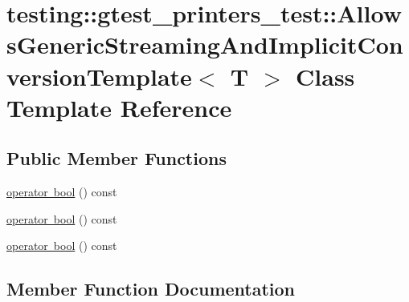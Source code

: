\hypertarget{classtesting_1_1gtest__printers__test_1_1_allows_generic_streaming_and_implicit_conversion_template}{}\section{testing\+::gtest\+\_\+printers\+\_\+test\+::Allows\+Generic\+Streaming\+And\+Implicit\+Conversion\+Template$<$ T $>$ Class Template Reference}
\label{classtesting_1_1gtest__printers__test_1_1_allows_generic_streaming_and_implicit_conversion_template}
\subsection*{Public Member Functions}
\begin{DoxyCompactItemize}
\item 
\mbox{\hyperlink{classtesting_1_1gtest__printers__test_1_1_allows_generic_streaming_and_implicit_conversion_template_af5f8ea44d7d86283b4c004a994ddd7f9}{operator bool}} () const
\item 
\mbox{\hyperlink{classtesting_1_1gtest__printers__test_1_1_allows_generic_streaming_and_implicit_conversion_template_af5f8ea44d7d86283b4c004a994ddd7f9}{operator bool}} () const
\item 
\mbox{\hyperlink{classtesting_1_1gtest__printers__test_1_1_allows_generic_streaming_and_implicit_conversion_template_af5f8ea44d7d86283b4c004a994ddd7f9}{operator bool}} () const
\end{DoxyCompactItemize}


\subsection{Member Function Documentation}
\mbox{\label{classtesting_1_1gtest__printers__test_1_1_allows_generic_streaming_and_implicit_conversion_template_af5f8ea44d7d86283b4c004a994ddd7f9}} 

